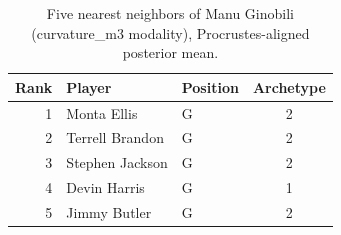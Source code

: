 \begin{table}[htbp]
  \centering\small
  \begin{tabular}{rllc}
    \toprule
    Rank & Player & Position & Archetype \\
    \midrule
    1 & Monta Ellis & G & 2 \\
    2 & Terrell Brandon & G & 2 \\
    3 & Stephen Jackson & G & 2 \\
    4 & Devin Harris & G & 1 \\
    5 & Jimmy Butler & G & 2 \\
    \bottomrule
  \end{tabular}
  \caption{Five nearest neighbors of Manu Ginobili (curvature_m3 modality), Procrustes-aligned posterior mean.}
  \label{tab:Manu_Ginobili_neighbors_curvature_m3}
\end{table}

